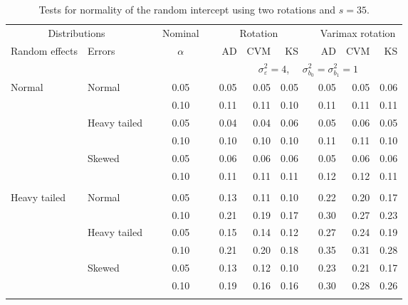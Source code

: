 \begin{table}[ht]
\caption{\label{tab:simb035}Tests for normality of the random intercept using two rotations and $s = 35$.}
\begin{scriptsize}
\begin{center}
\begin{tabular}{ll p{.1cm} c p{.1cm} rrr p{.1cm} rrr}
  \hline
  \multicolumn{2}{c}{Distributions}& & Nominal & &  \multicolumn{3}{c}{Rotation} & & \multicolumn{3}{c}{Varimax rotation} \\ \cline{1-2} \cline{6-8} \cline{10-12}   
  Random effects & Errors & & $\alpha$ & & AD & CVM & KS & & AD & CVM & KS \\ 
   \hline
& && && \multicolumn{7}{c}{$\sigma_{\varepsilon}^2 = 4$, \ \ $\sigma_{b_0}^2 = \sigma_{b_1}^2 = 1$} \\ \cline{6-12}
\rowcolor{gray!20}Normal       & Normal       && 0.05 &&  0.05 & 0.05 & 0.05 && 0.05 & 0.05 & 0.06 \\ 
\rowcolor{gray!20}             &              && 0.10 &&  0.11 & 0.11 & 0.10 && 0.11 & 0.11 & 0.11 \\ 
\rowcolor{gray!20}             & Heavy tailed && 0.05 &&  0.04 & 0.04 & 0.06 && 0.05 & 0.06 & 0.05 \\ 
\rowcolor{gray!20}             &              && 0.10 &&  0.10 & 0.10 & 0.10 && 0.11 & 0.11 & 0.10 \\ 
\rowcolor{gray!20}             & Skewed       && 0.05 &&  0.06 & 0.06 & 0.06 && 0.05 & 0.06 & 0.06 \\ 
\rowcolor{gray!20}             &              && 0.10 &&  0.11 & 0.11 & 0.11 && 0.12 & 0.12 & 0.11 \\ 
             &&&&&&&&&&&\\
Heavy tailed & Normal       && 0.05 &&  0.13 & 0.11 & 0.10 && 0.22 & 0.20 & 0.17 \\ 
             &              && 0.10 &&  0.21 & 0.19 & 0.17 && 0.30 & 0.27 & 0.23 \\ 
             & Heavy tailed && 0.05 &&  0.15 & 0.14 & 0.12 && 0.27 & 0.24 & 0.19 \\ 
             &              && 0.10 &&  0.21 & 0.20 & 0.18 && 0.35 & 0.31 & 0.28 \\ 
             & Skewed       && 0.05 &&  0.13 & 0.12 & 0.10 && 0.23 & 0.21 & 0.17 \\ 
             &              && 0.10 &&  0.19 & 0.16 & 0.16 && 0.30 & 0.28 & 0.26 \\ 
             &&&&&&&&&&&\\

\end{tabular}
\end{center}
\end{scriptsize}
\end{table}
